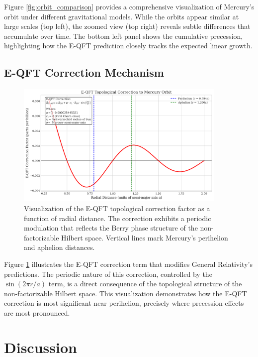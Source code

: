 \documentclass[11pt]{article}
\theoremstyle{definition}
\begin{document}
Figure \ref{fig:orbit_comparison} provides a comprehensive visualization of Mercury's orbit under different gravitational models. While the orbits appear similar at large scales (top left), the zoomed view (top right) reveals subtle differences that accumulate over time. The bottom left panel shows the cumulative precession, highlighting how the E-QFT prediction closely tracks the expected linear growth.

\subsection{E-QFT Correction Mechanism}

\begin{figure}[ht]
	\centering
	\includegraphics[width=0.9\textwidth]{paper_assets/eqft_correction_visualization.png}
	\caption{Visualization of the E-QFT topological correction factor as a function of radial distance. The correction exhibits a periodic modulation that reflects the Berry phase structure of the non-factorizable Hilbert space. Vertical lines mark Mercury's perihelion and aphelion distances.}
	\label{fig:eqft_correction}
\end{figure}

Figure \ref{fig:eqft_correction} illustrates the E-QFT correction term that modifies General Relativity's predictions. The periodic nature of this correction, controlled by the $\sin(2\pi r/a)$ term, is a direct consequence of the topological structure of the non-factorizable Hilbert space. This visualization demonstrates how the E-QFT correction is most significant near perihelion, precisely where precession effects are most pronounced.

\section{Discussion}
\end{document}
